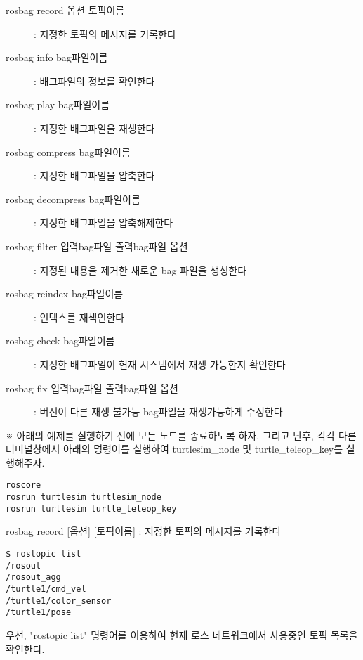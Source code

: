 \vspace{\baselineskip}
\noindent
\begin{description}
\item[rosbag record 옵션 토픽이름] : 지정한 토픽의 메시지를 기록한다
\item[rosbag info bag파일이름] : 배그파일의 정보를 확인한다
\item[rosbag play bag파일이름] : 지정한 배그파일을 재생한다

\item[rosbag compress bag파일이름] : 지정한 배그파일을 압축한다
\item[rosbag decompress bag파일이름] : 지정한 배그파일을 압축해제한다

\item[rosbag filter 입력bag파일 출력bag파일 옵션] : 지정된 내용을 제거한 새로운 bag 파일을 생성한다
\item[rosbag reindex bag파일이름] : 인덱스를 재색인한다

\item[rosbag check bag파일이름] : 지정한 배그파일이 현재 시스템에서 재생 가능한지 확인한다
\item[rosbag fix 입력bag파일 출력bag파일 옵션] : 버전이 다른 재생 불가능 bag파일을 재생가능하게 수정한다
\end{description}

\vspace{\baselineskip}
\noindent
※ 아래의 예제를 실행하기 전에 모든 노드를 종료하도록 하자. 그리고 난후, 각각 다른 터미널창에서 아래의 명령어를 실행하여 turtlesim\_node 및 turtle\_teleop\_key를 실행해주자.

\begin{lstlisting}[language=ROS]
roscore
rosrun turtlesim turtlesim_node 
rosrun turtlesim turtle_teleop_key
\end{lstlisting}

\setcounter{num}{0}

\vspace{\baselineskip}
\noindent
{}\circled{\thenum} rosbag record [옵션] [토픽이름] : 지정한 토픽의 메시지를 기록한다

\begin{lstlisting}[language=ROS]
$ rostopic list
/rosout
/rosout_agg
/turtle1/cmd_vel
/turtle1/color_sensor
/turtle1/pose
\end{lstlisting}

\noindent
우선, "rostopic list" 명령어를 이용하여 현재 로스 네트워크에서 사용중인 토픽 목록을 확인한다.


